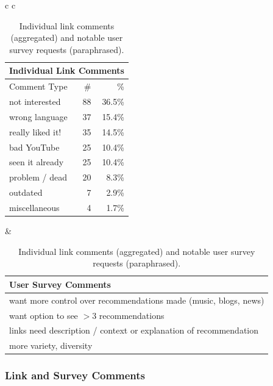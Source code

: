 \begin{table}[t!]
\centering
\footnotesize
\begin{tabular}{c c}
\hspace{-3mm} 
\begin{tabular}{|l|r|r|} 
\multicolumn{3}{c}{Individual Link Comments} \\ \hline
Comment Type & \# & \% \\ \hline %
not interested & 88 & 36.5\% \\
wrong language & 37 & 15.4\% \\
really liked it! & 35 & 14.5\% \\
bad YouTube & 25 & 10.4\% \\
seen it	already & 25 & 10.4\% \\
problem / dead & 20 & 8.3\% \\
outdated & 7 & 2.9\% \\	
miscellaneous & 4 & 1.7\% \\
\hline
\end{tabular}
&
\hspace{-3mm} \begin{tabular}{|p{3.34cm}|}
\multicolumn{1}{p{3.34cm}}{User Survey Comments}\\ \hline
want more control over recommendations made (music, blogs, news)\\ \hline
want option to see $> 3$ recommendations \\ \hline
links need description / context or explanation of recommendation \\ \hline 
more variety, diversity\\ \hline
\end{tabular}
\end{tabular}
\caption{Individual link comments (aggregated)  
and notable user survey requests (paraphrased).}
\label{table:survey}
\vspace{-3mm}
\end{table}

\subsubsection{Link and Survey Comments}

